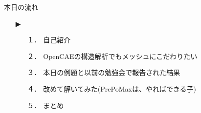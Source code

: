 \begin{frame}{本日の流れ}
  \begin{itemize}
     \item[▶] 
     \begin{itemize}[itemsep=1.3ex, leftmargin=1cm]
       \item[１．] 自己紹介
       \item[２．] OpenCAEの構造解析でもメッシュにこだわりたい
       \item[３．] 本日の例題と以前の勉強会で報告された結果
       \item[４．] 改めて解いてみた(PrePoMaxは、やればできる子)
       \item[５．] まとめ
    \end{itemize}
  \end{itemize}
\end{frame}
